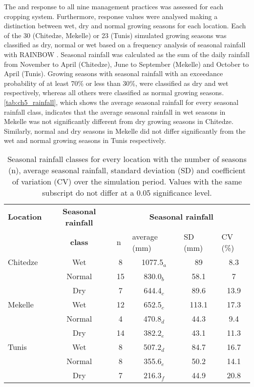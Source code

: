 The \Y and \WPET response to all nine management practices was assessed for each cropping system. Furthermore, response values were analysed making a distinction between wet, dry and normal growing seasons for each location. Each of the 30 (Chitedze, Mekelle) or 23 (Tunis) simulated growing seasons was classified as dry, normal or wet based on a frequency analysis of seasonal rainfall with RAINBOW \parencite{raes2006a}. Seasonal rainfall was calculated as the sum of the daily rainfall from November to April (Chitedze), June to September (Mekelle) and October to April (Tunis). Growing seasons with seasonal rainfall with an exceedance probability of at least 70\% or less than 30\%, were classified as dry and wet respectively, whereas all others were classified as normal growing seasons. \autoref{tab:ch5_rainfall}, which shows the average seasonal rainfall for every seasonal rainfall class, indicates that the average seasonal rainfall in wet seasons in Mekelle was not significantly different from dry growing seasons in Chitedze. Similarly, normal and dry seasons in Mekelle did not differ significantly from the wet and normal growing seasons in Tunis respectively. 

\begin{table}
 	\caption{Seasonal rainfall classes for every location with the number of seasons (n), average seasonal rainfall, standard deviation (SD) and coefficient of variation (CV) over the simulation period. Values with the same subscript do not differ at a 0.05 significance level.}
\begin{tabular}{lccccc}
\toprule
\multicolumn{1}{l}{\textbf{Location }} & \multicolumn{1}{c}{\textbf{Seasonal rainfall}} & \multicolumn{4}{c}{\textbf{Seasonal rainfall }} \\
      & \multicolumn{1}{c}{\textbf{class}}  & \multicolumn{1}{l}{n} & \multicolumn{1}{l}{average (\si{mm})} & \multicolumn{1}{l}{SD (\si{mm})} & \multicolumn{1}{l}{CV (\%)} \\
\midrule
\multicolumn{1}{l}{Chitedze} & Wet   & 8     & 1077.5$_a$ & 89    & 8.3 \\
\multicolumn{1}{l}{} & Normal & 15    & 830.0$_b$  & 58.1  & 7 \\
\multicolumn{1}{l}{} & Dry   & 7     & 644.4$_c$ & 89.6  & 13.9 \\
\multicolumn{1}{l}{Mekelle} & Wet   & 12    & 652.5$_c$ & 113.1 & 17.3 \\
\multicolumn{1}{l}{} & Normal & 4     & 470.8$_d$ & 44.3  & 9.4 \\
\multicolumn{1}{l}{} & Dry   & 14    & 382.2$_e$ & 43.1  & 11.3 \\
\multicolumn{1}{l}{Tunis} & Wet   & 8     & 507.2$_d$ & 84.7  & 16.7 \\
\multicolumn{1}{l}{} & Normal & 8     & 355.6$_e$ & 50.2  & 14.1 \\
      & Dry   & 7     & 216.3$_f$ & 44.9  & 20.8 \\
\bottomrule
\end{tabular}%
  \label{tab:ch5_rainfall}%
\end{table}

